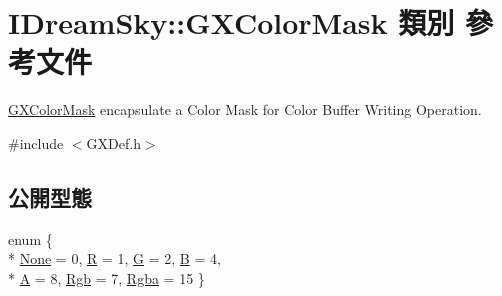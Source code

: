 \hypertarget{class_i_dream_sky_1_1_g_x_color_mask}{}\section{I\+Dream\+Sky\+:\+:G\+X\+Color\+Mask 類別 參考文件}
\label{class_i_dream_sky_1_1_g_x_color_mask}


\hyperlink{class_i_dream_sky_1_1_g_x_color_mask}{G\+X\+Color\+Mask} encapsulate a Color Mask for Color Buffer Writing Operation.  




{\ttfamily \#include $<$G\+X\+Def.\+h$>$}

\subsection*{公開型態}
\begin{DoxyCompactItemize}
\item 
enum \{ \\*
\hyperlink{class_i_dream_sky_1_1_g_x_color_mask_a5e0981194bd89cddc402cd085318f8bbad53afc7eacb469bcd2e13766387e8e77}{None} = 0, 
\hyperlink{class_i_dream_sky_1_1_g_x_color_mask_a5e0981194bd89cddc402cd085318f8bba60039493c971688176f829f5b7dc0226}{R} = 1, 
\hyperlink{class_i_dream_sky_1_1_g_x_color_mask_a5e0981194bd89cddc402cd085318f8bbae41225e067d91f9684be5c46e581d08e}{G} = 2, 
\hyperlink{class_i_dream_sky_1_1_g_x_color_mask_a5e0981194bd89cddc402cd085318f8bbaf8ee50a2e379c51a983ee5d11548b1b7}{B} = 4, 
\\*
\hyperlink{class_i_dream_sky_1_1_g_x_color_mask_a5e0981194bd89cddc402cd085318f8bba8bdc786778ad6362fd631498b14691b9}{A} = 8, 
\hyperlink{class_i_dream_sky_1_1_g_x_color_mask_a5e0981194bd89cddc402cd085318f8bbac00e2cfeabfde3e8fa3cedfa71504d2a}{Rgb} = 7, 
\hyperlink{class_i_dream_sky_1_1_g_x_color_mask_a5e0981194bd89cddc402cd085318f8bbac7d7acfee6fabaad2dadc615db28af6d}{Rgba} = 15
 \}
\end{DoxyCompactItemize}

